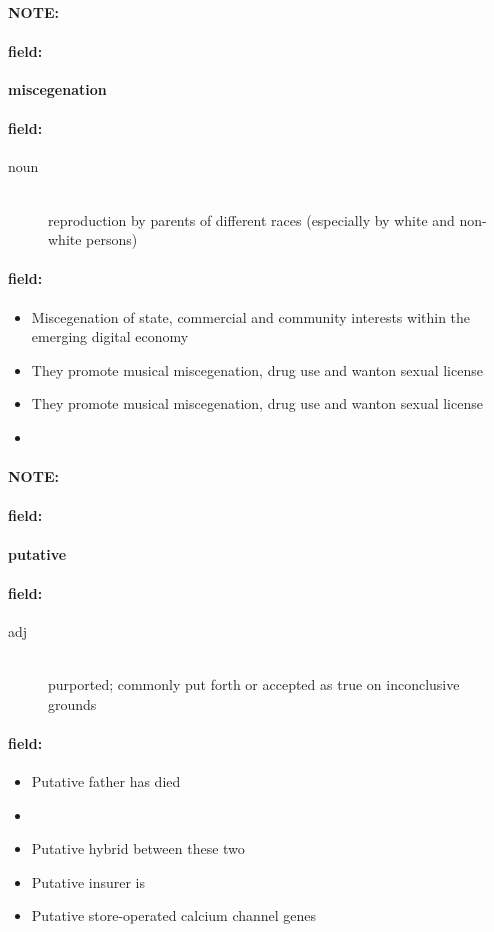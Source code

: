 \documentclass[12pt]{article}
\newenvironment{note}{\paragraph{NOTE:}}{}
\newenvironment{field}{\paragraph{field:}}{}
\begin{document}
\begin{note}
\begin{field}
\textbf{\large miscegenation}
\end{field}


\begin{field}
\begin{description}
\item[noun] \hfill \\ 
reproduction by parents of different races (especially by white and non-white persons)

\end{description}
\end{field}

\begin{field}
\begin{itemize}
\item Miscegenation of state, commercial and community interests within the emerging digital economy
\item They promote musical miscegenation, drug use and wanton sexual license
\item They promote musical miscegenation, drug use and wanton sexual license
\item 
\end{itemize}
\end{field}
\end{note}
\begin{note}
\begin{field}
\textbf{\large putative}
\end{field}


\begin{field}
\begin{description}
\item[adj] \hfill \\ 
purported; commonly put forth or accepted as true on inconclusive grounds

\end{description}
\end{field}

\begin{field}
\begin{itemize}
\item Putative father has died
\item 
\item Putative hybrid between these two
\item Putative insurer is
\item Putative store-operated calcium channel genes
\end{itemize}
\end{field}
\end{note}
\end{document}
